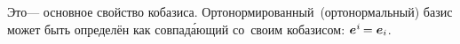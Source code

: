 \begin{otherlanguage}{russian}
\vspace{-0.1em}\noindent Это\:--- основное свойство кобазиса. Орто\-нормирован\-ный~(орто\-нормаль\-ный) базис может быть определён как совпад\'{а}ющий со~своим кобазисом: ${\bm{e}^{\hspace{.05ex}i} \hspace{-0.2ex} = \bm{e}_{i}}$.


\begin{comment} %
\vspace{-0.5em}\[
\bm{a}_i \dotp \bm{a}^{\hspace{0.1ex}j} \hspace{-0.1ex} = \hspace{-0.2ex}
\scalebox{0.8}[0.8]{$\left[ \begin{array}{ccc}
\bm{a}_1 \hspace{-0.1ex} \dotp \bm{a}^{\hspace{-0.1ex}1} & \bm{a}_1 \hspace{-0.1ex} \dotp \bm{a}^2 & \bm{a}_1 \hspace{-0.1ex} \dotp \bm{a}^3 \\
\bm{a}_2 \hspace{-0.1ex} \dotp \bm{a}^{\hspace{-0.1ex}1} & \bm{a}_2 \hspace{-0.1ex} \dotp \bm{a}^2 & \bm{a}_2 \hspace{-0.1ex} \dotp \bm{a}^3 \\
\bm{a}_3 \hspace{-0.1ex} \dotp \bm{a}^{\hspace{-0.1ex}1} & \bm{a}_3 \hspace{-0.1ex} \dotp \bm{a}^2 & \bm{a}_3 \hspace{-0.1ex} \dotp \bm{a}^3
\end{array} \right]$} \!=\!
\scalebox{0.8}[0.8]{$\left[ \begin{array}{ccc}
1 & 0 & 0 \\
0 & 1 & 0 \\
0 & 0 & 1
\end{array} \right]$} \!=
\hspace{0.1ex} \delta_i^{\hspace{0.1ex}j}
\]
\end{comment} %


\end{otherlanguage}
